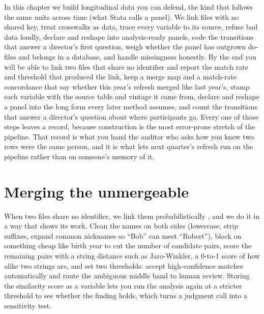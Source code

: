 \documentclass[
    a4paper,
    fontsize=10pt,
    twoside=true,
    numbers=noenddot,
]{kaobook}
\begin{document}
In this chapter we build longitudinal data you can defend, the kind that follows the same units across time (what Stata calls a panel). We link files with no shared key, treat crosswalks as data, trace every variable to its source, refuse bad data loudly, declare and reshape into analysis-ready panels, code the transitions that answer a director's first question, weigh whether the panel has outgrown do-files and belongs in a database, and handle missingness honestly. By the end you will be able to link two files that share no identifier and report the match rate and threshold that produced the link, keep a merge map and a match-rate concordance that say whether this year's refresh merged like last year's, stamp each variable with the source table and vintage it came from, declare and reshape a panel into the long form every later method assumes, and count the transitions that answer a director's question about where participants go. Every one of those steps leaves a record, because construction is the most error-prone stretch of the pipeline. That record is what you hand the auditor who asks how you knew two rows were the same person, and it is what lets next quarter's refresh run on the pipeline rather than on someone's memory of it.

\section{Merging the unmergeable}
When two files share no identifier, we link them probabilistically \parencite{fellegi1969linkage}, and we do it in a way that shows its work. Clean the names on both sides (lowercase, strip suffixes, expand common nicknames so \enquote{Bob} can meet \enquote{Robert}), block on something cheap like birth year to cut the number of candidate pairs, score the remaining pairs with a string distance such as Jaro-Winkler, a 0-to-1 score of how alike two strings are, and set two thresholds: accept high-confidence matches automatically and route the ambiguous middle band to human review. Storing the similarity score as a variable lets you run the analysis again at a stricter threshold to see whether the finding holds, which turns a judgment call into a sensitivity test.
\end{document}
